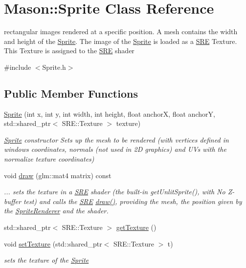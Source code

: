 \hypertarget{class_mason_1_1_sprite}{}\section{Mason\+:\+:Sprite Class Reference}
\label{class_mason_1_1_sprite}


rectangular images rendered at a specific position. A mesh contains the width and height of the \hyperlink{class_mason_1_1_sprite}{Sprite}. The image of the \hyperlink{class_mason_1_1_sprite}{Sprite} is loaded as a \hyperlink{namespace_s_r_e}{S\+RE} Texture. This Texture is assigned to the \hyperlink{namespace_s_r_e}{S\+RE} shader  




{\ttfamily \#include $<$Sprite.\+h$>$}

\subsection*{Public Member Functions}
\begin{DoxyCompactItemize}
\item 
\hyperlink{class_mason_1_1_sprite_a40dbab8285c1d3bdc95dfe1806736402}{Sprite} (int x, int y, int width, int height, float anchorX, float anchorY, std\+::shared\+\_\+ptr$<$ S\+R\+E\+::\+Texture $>$ texture)
\begin{DoxyCompactList}\small\item\em \hyperlink{class_mason_1_1_sprite}{Sprite} constructor Sets up the mesh to be rendered (with vertices defined in windows coordinates, normals (not used in 2D graphics) and U\+Vs with the normalize texture coordinates) \end{DoxyCompactList}\item 
void \hyperlink{class_mason_1_1_sprite_ab79c7da6288a30931a376c53544f7171}{draw} (glm\+::mat4 matrix) const
\begin{DoxyCompactList}\small\item\em ... sets the texture in a \hyperlink{namespace_s_r_e}{S\+RE} shader (the built-\/in get\+Unlit\+Sprite(), with No Z-\/buffer test) and calls the \hyperlink{namespace_s_r_e}{S\+RE} \hyperlink{class_mason_1_1_sprite_ab79c7da6288a30931a376c53544f7171}{draw()}, providing the mesh, the position given by the \hyperlink{class_mason_1_1_sprite_renderer}{Sprite\+Renderer} and the shader. \end{DoxyCompactList}\item 
std\+::shared\+\_\+ptr$<$ S\+R\+E\+::\+Texture $>$ \hyperlink{class_mason_1_1_sprite_a712bae6921e612c77150a2741a0be7b1}{get\+Texture} ()
\item 
void \hyperlink{class_mason_1_1_sprite_a0331c6ca9aeb29be568485209cabcf06}{set\+Texture} (std\+::shared\+\_\+ptr$<$ S\+R\+E\+::\+Texture $>$ t)
\begin{DoxyCompactList}\small\item\em sets the texture of the \hyperlink{class_mason_1_1_sprite}{Sprite} \end{DoxyCompactList}\end{DoxyCompactItemize}
